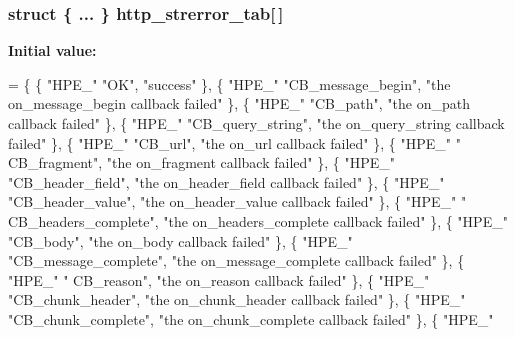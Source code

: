 \subsubsection[{http\+\_\+strerror\+\_\+tab}]{\setlength{\rightskip}{0pt plus 5cm}struct \{ ... \}   http\+\_\+strerror\+\_\+tab[$\,$]\hspace{0.3cm}{\ttfamily [static]}}\label{http__parser_8c_ac5e719ec2ac957db866cfd9bdfc44eb8}
{\bfseries Initial value\+:}
\begin{DoxyCode}
= \{
      \{ \textcolor{stringliteral}{"HPE\_"} \textcolor{stringliteral}{"OK"},  \textcolor{stringliteral}{"success"}  \},         \{ \textcolor{stringliteral}{"HPE\_"} \textcolor{stringliteral}{"CB\_message\_begin"},  \textcolor{stringliteral}{"the on\_message\_begin callback
       failed"}  \},    \{ \textcolor{stringliteral}{"HPE\_"} \textcolor{stringliteral}{"CB\_path"},  \textcolor{stringliteral}{"the on\_path callback failed"}  \},    \{ \textcolor{stringliteral}{"HPE\_"} \textcolor{stringliteral}{"CB\_query\_string"},  \textcolor{stringliteral}{"the
       on\_query\_string callback failed"}  \},    \{ \textcolor{stringliteral}{"HPE\_"} \textcolor{stringliteral}{"CB\_url"},  \textcolor{stringliteral}{"the on\_url callback failed"}  \},    \{ \textcolor{stringliteral}{"HPE\_"} \textcolor{stringliteral}{"
      CB\_fragment"},  \textcolor{stringliteral}{"the on\_fragment callback failed"}  \},    \{ \textcolor{stringliteral}{"HPE\_"} \textcolor{stringliteral}{"CB\_header\_field"},  \textcolor{stringliteral}{"the on\_header\_field
       callback failed"}  \},    \{ \textcolor{stringliteral}{"HPE\_"} \textcolor{stringliteral}{"CB\_header\_value"},  \textcolor{stringliteral}{"the on\_header\_value callback failed"}  \},    \{ \textcolor{stringliteral}{"HPE\_"} \textcolor{stringliteral}{"
      CB\_headers\_complete"},  \textcolor{stringliteral}{"the on\_headers\_complete callback failed"}  \},    \{ \textcolor{stringliteral}{"HPE\_"} \textcolor{stringliteral}{"CB\_body"},  \textcolor{stringliteral}{"the on\_body callback
       failed"}  \},    \{ \textcolor{stringliteral}{"HPE\_"} \textcolor{stringliteral}{"CB\_message\_complete"},  \textcolor{stringliteral}{"the on\_message\_complete callback failed"}  \},    \{ \textcolor{stringliteral}{"HPE\_"} \textcolor{stringliteral}{"
      CB\_reason"},  \textcolor{stringliteral}{"the on\_reason callback failed"}  \},    \{ \textcolor{stringliteral}{"HPE\_"} \textcolor{stringliteral}{"CB\_chunk\_header"},  \textcolor{stringliteral}{"the on\_chunk\_header
       callback failed"}  \},    \{ \textcolor{stringliteral}{"HPE\_"} \textcolor{stringliteral}{"CB\_chunk\_complete"},  \textcolor{stringliteral}{"the on\_chunk\_complete callback failed"}  \},         \{ \textcolor{stringliteral}{"HPE\_"}

\end{DoxyCode}
